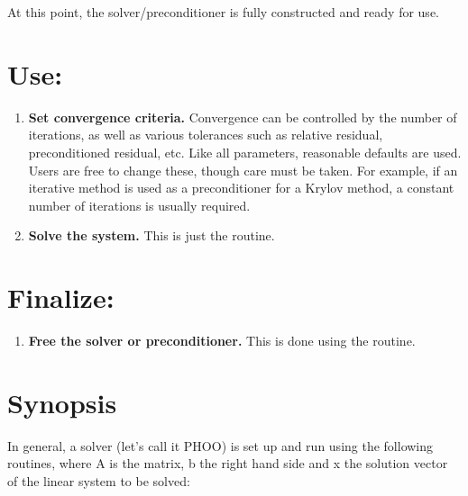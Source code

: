 At this point, the solver/preconditioner is fully constructed and
ready for use.


\section*{Use:}

\begin{enumerate}

\item
{\bf Set convergence criteria.}  Convergence can be controlled by the
number of iterations, as well as various tolerances such as relative
residual, preconditioned residual, etc.  Like all parameters,
reasonable defaults are used.  Users are free to change these, though
care must be taken.  For example, if an iterative method is used as a
preconditioner for a Krylov method, a constant number of iterations is
usually required.

\item
{\bf Solve the system.}  This is just the  routine.

\end{enumerate}


\section*{Finalize:}

\begin{enumerate}

\item
{\bf Free the solver or preconditioner.} This is done using the
 routine.

\end{enumerate}


\section* {Synopsis}

In general, a solver (let's call it PHOO) is set up and run using the following routines,
where A is the matrix, b the right hand side and x the solution vector
of the linear system to be solved:


